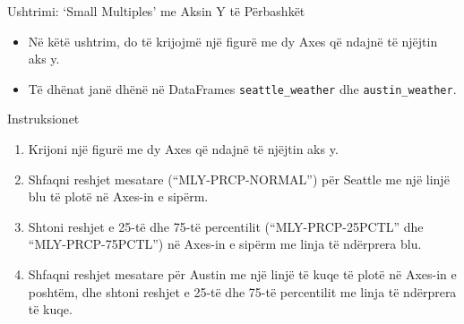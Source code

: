 \documentclass[
  ignorenonframetext,
]{beamer}
\begin{document}
\begin{frame}[fragile]{Ushtrimi: `Small Multiples' me Aksin Y të
Përbashkët}
\protect\hypertarget{ushtrimi-small-multiples-me-aksin-y-tuxeb-puxebrbashkuxebt}{}
\begin{itemize}
\item
  Në këtë ushtrim, do të krijojmë një figurë me dy Axes që ndajnë të
  njëjtin aks y.
\item
  Të dhënat janë dhënë në DataFrames \texttt{seattle\_weather} dhe
  \texttt{austin\_weather}.
\end{itemize}
\end{frame}

\begin{frame}{Instruksionet}
\protect\hypertarget{instruksionet-5}{}
\begin{enumerate}
\item
  Krijoni një figurë me dy Axes që ndajnë të njëjtin aks y.
\item
  Shfaqni reshjet mesatare (``MLY-PRCP-NORMAL'') për Seattle me një
  linjë blu të plotë në Axes-in e sipërm.
\item
  Shtoni reshjet e 25-të dhe 75-të percentilit (``MLY-PRCP-25PCTL'' dhe
  ``MLY-PRCP-75PCTL'') në Axes-in e sipërm me linja të ndërprera blu.
\item
  Shfaqni reshjet mesatare për Austin me një linjë të kuqe të plotë në
  Axes-in e poshtëm, dhe shtoni reshjet e 25-të dhe 75-të percentilit me
  linja të ndërprera të kuqe.
\end{enumerate}
\end{frame}
\end{document}
